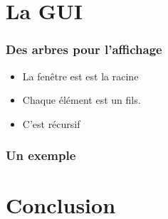 \documentclass[pdf]{beamer}
\begin{document}
\section{La GUI}
\begin{frame}
    \frametitle{Des arbres pour l'affichage}
    \begin{itemize}
        \item La fenêtre est est la racine
        \item Chaque élément est un fils.
        \item C'est récursif
    \end{itemize}
\end{frame}

\begin{frame}[fragile]
    \frametitle{Un exemple}
    
\end{frame}
\section{Conclusion}
\end{document}
